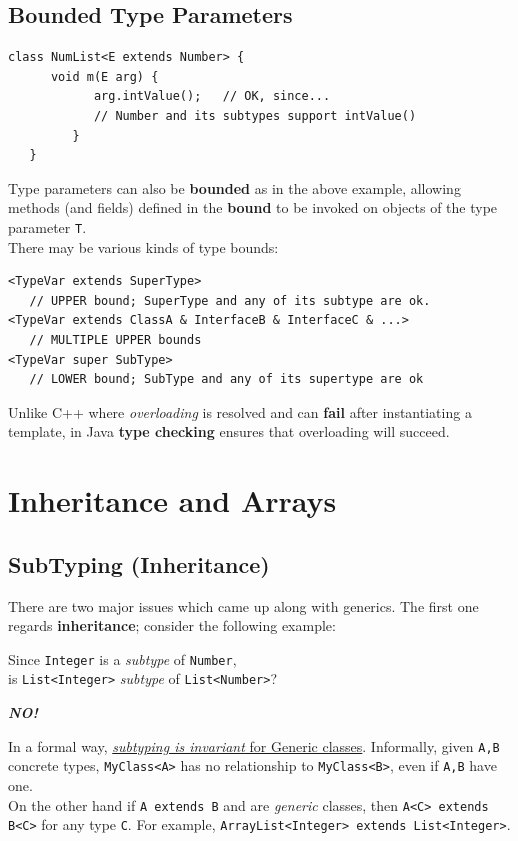 \subsection{Bounded Type Parameters}
\begin{lstlisting}
class NumList<E extends Number> {
      void m(E arg) {
            arg.intValue();   // OK, since...
            // Number and its subtypes support intValue()
         }
   }
\end{lstlisting}

Type parameters can also be \textbf{bounded} as in the above example,
allowing methods (and fields) defined in the \textbf{bound} to be invoked on objects of the type parameter \lstinline|T|.\\
There may be various kinds of type bounds:
\begin{lstlisting}
<TypeVar extends SuperType>
   // UPPER bound; SuperType and any of its subtype are ok.
<TypeVar extends ClassA & InterfaceB & InterfaceC & ...>
   // MULTIPLE UPPER bounds
<TypeVar super SubType>
   // LOWER bound; SubType and any of its supertype are ok
\end{lstlisting}

Unlike C++ where \textit{overloading} is resolved and can \textbf{fail} after
instantiating a template, in Java \textbf{type checking} ensures that
overloading will succeed.

\section{Inheritance and Arrays}
\subsection{SubTyping (Inheritance)}
There are two major issues which came up along with generics.
The first one regards \textbf{inheritance}; 
consider the following example:
\begin{center}
   Since \lstinline|Integer| is a \textit{subtype} of \lstinline|Number|,\\
   is \lstinline|List<Integer>| \textit{subtype} of \lstinline|List<Number>|?\nl

   {\color{red}\textbf{\textit{NO!}}}
\end{center}
In a formal way, \ul{\textit{subtyping is invariant} for Generic classes}.
Informally, given \lstinline|A,B| concrete types, \lstinline|MyClass<A>| has no relationship to \lstinline|MyClass<B>|,
even if \lstinline|A,B| have one.\\
On the other hand if \lstinline|A extends B| and are \textit{generic} classes, 
then \lstinline|A<C> extends B<C>| for any type \lstinline|C|.
For example, \lstinline|ArrayList<Integer> extends List<Integer>|.
\nl

